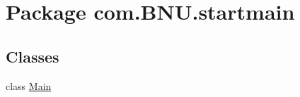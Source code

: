 \hypertarget{namespacecom_1_1_b_n_u_1_1startmain}{}\section{Package com.\+B\+N\+U.\+startmain}
\label{namespacecom_1_1_b_n_u_1_1startmain}
\subsection*{Classes}
\begin{DoxyCompactItemize}
\item 
class \mbox{\hyperlink{classcom_1_1_b_n_u_1_1startmain_1_1_main}{Main}}
\end{DoxyCompactItemize}

